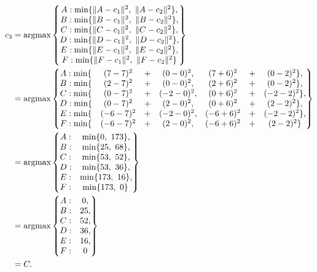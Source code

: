 \begin{alignat*}{3}
  c_3 &= \operatorname*{argmax} \left\{
  \begin{matrix}
    A : \min\{\lVert A - c_1 \rVert ^2,\ \lVert A - c_2 \rVert ^2\},\\
    B : \min\{\lVert B - c_1 \rVert ^2,\ \lVert B - c_2 \rVert ^2\},\\
    C : \min\{\lVert C - c_1 \rVert ^2,\ \lVert C - c_2 \rVert ^2\},\\
    D : \min\{\lVert D - c_1 \rVert ^2,\ \lVert D - c_2 \rVert ^2\},\\
    E : \min\{\lVert E - c_1 \rVert ^2,\ \lVert E - c_2 \rVert ^2\},\\
    F : \min\{\lVert F - c_1 \rVert ^2,\ \lVert F - c_2 \rVert ^2\}
  \end{matrix}\right\}\\
&= \operatorname*{argmax} \left\{
  \begin{matrix}
    A : \min\{&(7 - 7)^2  &+& (0 - 0)^2  ,& (7 + 6)^2  &+& (0 - 2)^2 \},\\
    B : \min\{&(2 - 7)^2  &+& (0 - 0)^2  ,& (2 + 6)^2  &+& (0 - 2)^2 \},\\
    C : \min\{&(0 - 7)^2  &+& (-2 - 0)^2 ,& (0 + 6)^2  &+& (-2 - 2)^2 \},\\
    D : \min\{&(0 - 7)^2  &+& (2 - 0)^2  ,& (0 + 6)^2  &+& (2 - 2)^2 \},\\
    E : \min\{&(-6 - 7)^2 &+& (-2 - 0)^2 ,& (-6 + 6)^2 &+& (-2 - 2)^2 \},\\
    F : \min\{&(-6 - 7)^2 &+& (2 - 0)^2  ,& (-6 + 6)^2 &+& (2 - 2)^2 \}
  \end{matrix}\right\}\\
&= \operatorname*{argmax} \left\{
  \begin{matrix}
    A : &\min\{0,  \ 173\},\\
    B : &\min\{25, \ 68\},\\
    C : &\min\{53, \ 52\},\\
    D : &\min\{53, \ 36\},\\
    E : &\min\{173,\ 16\},\\
    F : &\!\min\{173,\ 0\}
  \end{matrix}\right\}\\
&= \operatorname*{argmax} \left\{
  \begin{matrix}
    A : &0, \\
    B : &25,\\
    C : &52,\\
    D : &36,\\
    E : &16,\\
    F : &0
  \end{matrix}\right\}\\
&= C.
\end{alignat*}

